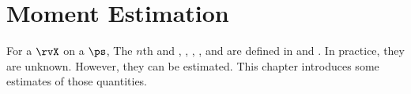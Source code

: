 \chapter{Moment Estimation}
\label{chp:moment_estimation}

For a  $\rvX$ on a  $\ps$,
The $n$th  and , , , , and 
are defined in  and .
In practice, they are unknown. However, they can be estimated.
This chapter introduces some estimates of those quantities.

